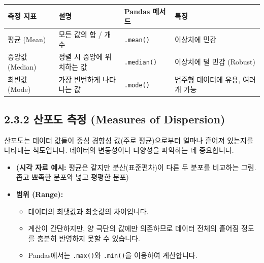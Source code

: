 \documentclass[
  letterpaper,
]{book}
\providecommand{\tightlist}{%
  \setlength{\itemsep}{0pt}\setlength{\parskip}{0pt}}
\begin{document}
\begin{longtable}[]{@{}
  >{\raggedright\arraybackslash}p{}
  >{\raggedright\arraybackslash}p{}
  >{\raggedright\arraybackslash}p{}
  >{\raggedright\arraybackslash}p{}@{}}
\toprule\noalign{}
\begin{minipage}[b]{\linewidth}\raggedright
측정 지표
\end{minipage} & \begin{minipage}[b]{\linewidth}\raggedright
설명
\end{minipage} & \begin{minipage}[b]{\linewidth}\raggedright
Pandas 메서드
\end{minipage} & \begin{minipage}[b]{\linewidth}\raggedright
특징
\end{minipage} \\
\midrule\noalign{}
\endhead
\bottomrule\noalign{}
\endlastfoot
평균 (Mean) & 모든 값의 합 / 개수 & \texttt{.mean()} & 이상치에 민감 \\
중앙값 (Median) & 정렬 시 중앙에 위치하는 값 & \texttt{.median()} &
이상치에 덜 민감 (Robust) \\
최빈값 (Mode) & 가장 빈번하게 나타나는 값 & \texttt{.mode()} & 범주형
데이터에 유용, 여러 개 가능 \\
\end{longtable}

\subsection{2.3.2 산포도 측정 (Measures of
Dispersion)}\label{uxc0b0uxd3ecuxb3c4-uxce21uxc815-measures-of-dispersion}

산포도는 데이터 값들이 중심 경향성 값(주로 평균)으로부터 얼마나 흩어져
있는지를 나타내는 척도입니다. 데이터의 변동성이나 다양성을 파악하는 데
중요합니다.

\begin{itemize}
\item
  \textbf{(시각 자료 예시:} 평균은 같지만 분산(표준편차)이 다른 두
  분포를 비교하는 그림. 좁고 뾰족한 분포와 넓고 평평한 분포)
\item
  \textbf{범위 (Range):}

  \begin{itemize}
  \tightlist
  \item
    데이터의 최댓값과 최솟값의 차이입니다.
  \item
    계산이 간단하지만, 양 극단의 값에만 의존하므로 데이터 전체의 흩어짐
    정도를 충분히 반영하지 못할 수 있습니다.
  \item
    Pandas에서는 \texttt{.max()}와 \texttt{.min()}을 이용하여
    계산합니다.
  \end{itemize}
\end{itemize}
\end{document}

